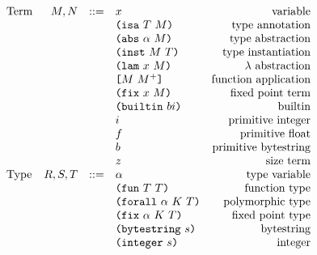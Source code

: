 \documentclass[../main.tex]{subfiles}
\begin{document}
\begin{figure*}[t]
    \centering
    \[\begin{array}{lrclr}
        \textrm{Term}             & M, N   & ::= & x                       & \textrm{variable}\\
                                  &     &     & \ann{M}{T}                 & \textrm{type annotation}\\
                                  &     &     & \abs{\alpha}{M}            & \textrm{type abstraction}\\
                                  &     &     & \inst{M}{T}                & \textrm{type instantiation}\\
                                  &     &     & \lam{x}{M}                 & \textrm{$\lambda$ abstraction}\\
                                  &     &     & \app{M}{M^+}               & \textrm{function application}\\
                                  &     &     & \fix{x}{M}                 & \textrm{fixed point term}\\
                                  &     &     & \builtin{bi}               & \textrm{builtin}\\
                                  &     &     & i                          & \textrm{primitive integer}\\
                                  &     &     & f                          & \textrm{primitive float}\\
                                  &     &     & b                          & \textrm{primitive bytestring}\\
                                  &     &     & z                          & \textrm{size term}\\
        \textrm{Type}             & R,S,T & ::= & \alpha                     & \textrm{type variable}\\
                                  &     &     & \funT{T}{T}                & \textrm{function type}\\
                                  &     &     & \forallT{\alpha}{K}{T}     & \textrm{polymorphic type}\\
                                  &     &     & \fixT{\alpha}{K}{T}        & \textrm{fixed point type}\\
                                  &     &     & \bytestringT{s}            & \textrm{bytestring}\\
                                  &     &     & \integerT{s}               & \textrm{integer}\\

\end{array}\]
\end{figure*}
\end{document}
